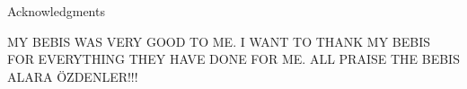 ﻿
\thispagestyle{empty}

\vspace*{20mm}

\begin{center}
    { Acknowledgments}
\end{center}

\vspace{10mm}


MY BEBIS WAS VERY GOOD TO ME. I WANT TO THANK MY BEBIS FOR EVERYTHING THEY HAVE DONE FOR ME. ALL PRAISE THE BEBIS ALARA ÖZDENLER!!!

\cleardoublepage{}

